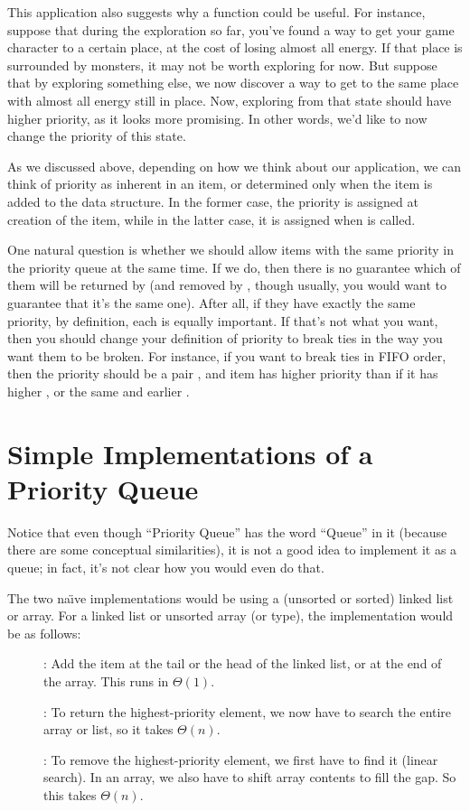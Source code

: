 This application also suggests why a function  could be
useful. For instance, suppose that during the exploration so far,
you've found a way to get your game character to a certain place, at
the cost of losing almost all energy. If that place is surrounded by
monsters, it may not be worth exploring for now.
But suppose that by exploring something else, we now discover a way to
get to the same place with almost all energy still in place. 
Now, exploring from that state should have higher priority, as it
looks more promising. In other words, we'd like to now change the
priority of this state.

As we discussed above, depending on how we think about our
application, we can think of priority as inherent in an item, or
determined only when the item is added to the data structure.
In the former case, the priority is assigned at creation of the item,
while in the latter case, it is assigned when  is called.

One natural question is whether we should allow items with the same
priority in the priority queue at the same time. 
If we do, then there is no guarantee which of them will be returned by
 (and removed by , though usually, you would
want to guarantee that it's the same one). 
After all, if they have exactly the same priority, by definition, each
is equally important.
If that's not what you want, then you should change your definition of
priority to break ties in the way you want them to be broken.
For instance, if you want to break ties in FIFO order, then the
priority should be a pair , and
item  has higher priority than  if it has higher
, or the same  and
earlier .

\section{Simple Implementations of a Priority Queue}
Notice that even though ``Priority Queue'' has the word ``Queue'' in
it (because there are some conceptual similarities), it is not a good
idea to implement it as a queue; in fact, it's not clear how you would
even do that.

The two na\"{\i}ve implementations would be using a (unsorted or sorted)
linked list or array. For a linked list or unsorted array (or
 type), the implementation would be as follows:
\begin{description}
\item[]: Add the item at the tail or the head of the linked
  list, or at the end of the array. This runs in $\Theta(1)$.
\item[]: To return the highest-priority element, we now
  have to search the entire array or list, so it takes $\Theta(n)$.
\item[]: To remove the highest-priority element, we first
  have to find it (linear search). In an array, we also have to shift
  array contents to fill the gap. So this takes $\Theta(n)$.
\end{description}

